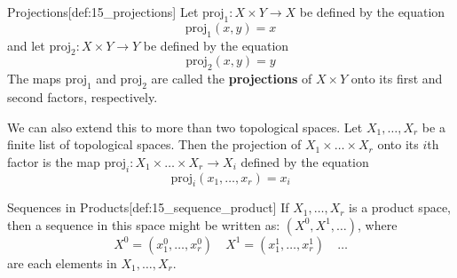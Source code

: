 \begin{defBox}{Projections}[def:15_projections]
    Let \( \mathrm{proj}_{ 1 } : X \times Y \rightarrow X \) be defined by the 
    equation
    \begin{equation*}
        \mathrm{proj}_{ 1 } ( x, y ) = x
    \end{equation*}
    and let \( \mathrm{proj}_{ 2 } : X \times Y \rightarrow Y \) be defined by 
    the 
    equation
    \begin{equation*}
        \mathrm{proj}_{ 2 } ( x, y ) = y
    \end{equation*}
    The maps \( \mathrm{proj}_{ 1 } \) and \( \mathrm{proj}_{ 2 } \) are called 
    the \textbf{projections} of \( X \times Y \) onto its first and second 
    factors, respectively.

    \baseSkip 

    We can also extend this to more than two topological spaces.
    Let \( X_{ 1 } , \ldots , X_{ r } \) be a finite list of topological
    spaces. 
    Then the projection of \( X_{ 1 } \times \ldots \times X_{ r } \) onto 
    its \( i \)th factor is the map 
    \( \mathrm{proj}_{ i } : X_{ 1 } \times \ldots \times 
    X_{ r } \rightarrow X_{ i } \) defined by the equation
    \begin{equation*}
        \mathrm{proj}_{ i } ( x_{ 1 } , \ldots , x_{ r } ) = x_{ i }
    \end{equation*}
\end{defBox}

\begin{defBox}{Sequences in Products}[def:15_sequence_product]
    If \( X_{ 1 } , \ldots , X_{ r } \) is a product space, then a sequence in
    this space might be written as: \( ( X^{ 0 }, X^{ 1 }, \ldots ) \), where
    \begin{equation*}
        X^{ 0 }
        =
        ( x_{ 1 }^{ 0 } , \ldots , x_{ r }^{ 0 } )
        \quad 
        X^{ 1 }
        =
        ( x_{ 1 }^{ 1 } , \ldots , x_{ r }^{ 1 } )
        \quad 
        \ldots
    \end{equation*}
    are each elements in \( X_{ 1 } , \ldots , X_{ r } \).
\end{defBox}